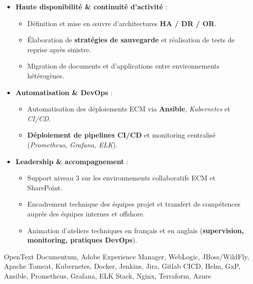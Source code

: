 \begin{experiences}
{\begin{itemize}[left=0pt,label={},itemsep=0.5em]
          \item \textbf{Haute disponibilité \& continuité d’activité} :
            \begin{itemize}[itemsep=0.2em,topsep=0.2em,parsep=0pt]
              \small
              \item Définition et mise en œuvre d’architectures \textbf{HA / DR / OR}.
              \item Élaboration de \textbf{stratégies de sauvegarde} et réalisation de tests de reprise après sinistre.
              \item Migration de documents et d’applications entre environnements hétérogènes.
            \end{itemize}

          \item \textbf{Automatisation \& DevOps} :
            \begin{itemize}[itemsep=0.2em,topsep=0.2em,parsep=0pt]
              \small
              \item Automatisation des déploiements ECM via \textbf{Ansible}, \textit{Kubernetes} et \textit{CI/CD}.
              \item \textbf{Déploiement de pipelines CI/CD} et monitoring centralisé (\textit{Prometheus, Grafana, ELK}).
            \end{itemize}


          \item \textbf{Leadership \& accompagnement} :
            \begin{itemize}[itemsep=0.2em,topsep=0.2em,parsep=0pt]
              \small
              \item Support niveau 3 sur les environnements collaboratifs ECM et SharePoint.
              \item Encadrement technique des équipes projet et transfert de compétences auprès des équipes internes et offshore.
              \item Animation d’ateliers techniques en français et en anglais (\textbf{supervision, monitoring, pratiques DevOps}).
            \end{itemize}
        \end{itemize}
        \vspace{0.5em}  %
    }
    {OpenText Documentum, Adobe Experience Manager, WebLogic, JBoss/WildFly, Apache Tomcat, Kubernetes, Docker, Jenkins, Jira, Gitlab CICD, Helm, GxP, Ansible, Prometheus, Grafana, ELK Stack, Nginx, Terraform, Azure}
    


\end{experiences}
